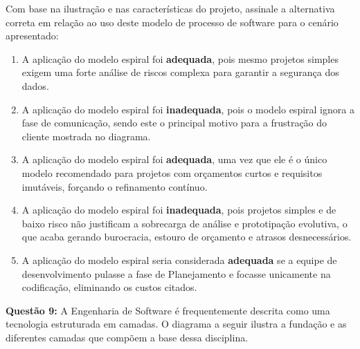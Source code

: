 \documentclass[12pt,a4paper]{article}
\begin{document}
Com base na ilustração e nas características do projeto, assinale a alternativa correta em relação ao uso deste modelo de processo de software para o cenário apresentado:

\begin{enumerate}[label=\textbf{\Alph*)}, itemsep=0.3cm]
    \item A aplicação do modelo espiral foi \textbf{adequada}, pois mesmo projetos simples exigem uma forte análise de riscos complexa para garantir a segurança dos dados.
    \item A aplicação do modelo espiral foi \textbf{inadequada}, pois o modelo espiral ignora a fase de comunicação, sendo este o principal motivo para a frustração do cliente mostrada no diagrama.
    \item A aplicação do modelo espiral foi \textbf{adequada}, uma vez que ele é o único modelo recomendado para projetos com orçamentos curtos e requisitos imutáveis, forçando o refinamento contínuo.
    \item A aplicação do modelo espiral foi \textbf{inadequada}, pois projetos simples e de baixo risco não justificam a sobrecarga de análise e prototipação evolutiva, o que acaba gerando burocracia, estouro de orçamento e atrasos desnecessários.
    \item A aplicação do modelo espiral seria considerada \textbf{adequada} se a equipe de desenvolvimento pulasse a fase de Planejamento e focasse unicamente na codificação, eliminando os custos citados.
\end{enumerate}

\vspace{0.8cm}
\textbf{Questão 9:} A Engenharia de Software é frequentemente descrita como uma tecnologia estruturada em camadas. O diagrama a seguir ilustra a fundação e as diferentes camadas que compõem a base dessa disciplina.

\begin{center}
\end{center}
\end{document}
